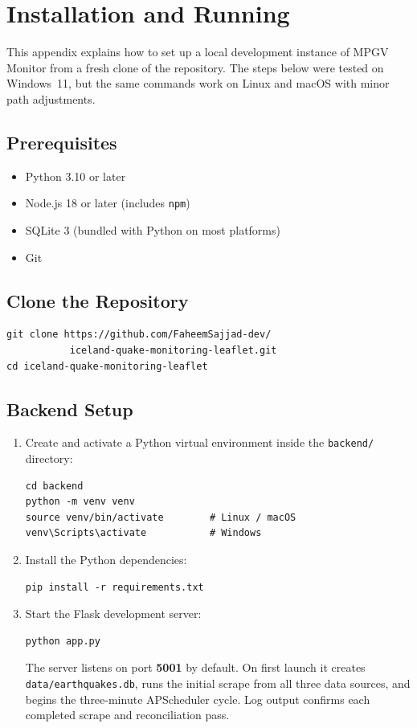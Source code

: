 \documentclass[12pt]{article}
\begin{document}
\section{Installation and Running}
\label{app:installation}

This appendix explains how to set up a local development instance of MPGV Monitor from a fresh clone of the repository. The steps below were tested on Windows~11, but the same commands work on Linux and macOS with minor path adjustments.

\subsection*{Prerequisites}

\begin{itemize}
    \item Python 3.10 or later
    \item Node.js 18 or later (includes \texttt{npm})
    \item SQLite 3 (bundled with Python on most platforms)
    \item Git
\end{itemize}

\subsection*{Clone the Repository}

\begin{verbatim}
git clone https://github.com/FaheemSajjad-dev/
           iceland-quake-monitoring-leaflet.git
cd iceland-quake-monitoring-leaflet
\end{verbatim}

\subsection*{Backend Setup}

\begin{enumerate}
    \item Create and activate a Python virtual environment inside the \texttt{backend/} directory:
\begin{verbatim}
cd backend
python -m venv venv
source venv/bin/activate        # Linux / macOS
venv\Scripts\activate           # Windows
\end{verbatim}

    \item Install the Python dependencies:
\begin{verbatim}
pip install -r requirements.txt
\end{verbatim}

    \item Start the Flask development server:
\begin{verbatim}
python app.py
\end{verbatim}

The server listens on port \textbf{5001} by default. On first launch it creates \texttt{data/earthquakes.db}, runs the initial scrape from all three data sources, and begins the three-minute APScheduler cycle. Log output confirms each completed scrape and reconciliation pass.
\end{enumerate}
\end{document}
